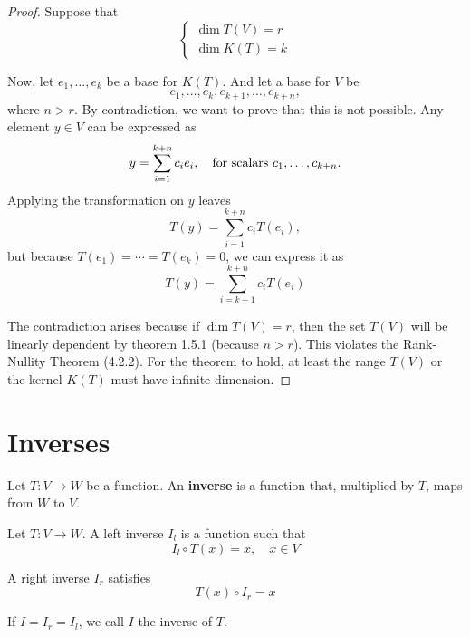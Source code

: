 \documentclass[../linear-spaces.tex]{subfiles}
\begin{document}
\begin{proof}
    Suppose that
    \begin{equation*}
        \begin{cases}
            \dim T(V) = r \\
            \dim K(T) = k
        \end{cases}
    \end{equation*}

    Now, let $e_1,\dots,e_k$ be a base for $K(T)$. And let a base for $V$ be
    \begin{equation*}
        e_1,\dots,e_k,e_{k+1},\dots,e_{k+n},
    \end{equation*}
    where $n > r$. By contradiction, we want to prove that this is not
    possible. Any element $y\in V$ can be expressed as
    \begin{equation*}
        y=\sum_{i=1}^{k+n}{c_i e_i},\quad \textnormal{for scalars } c_1,\dots,c_{k+n}.
    \end{equation*}
    Applying the transformation on $y$ leaves
    \begin{equation*}
        T(y) = \sum_{i=1}^{k+n}{c_i T(e_i)},
    \end{equation*}
    but because $T(e_1) = \cdots = T(e_k) = 0$, we can express it as
    \begin{equation*}
        T(y) = \sum_{i=k+1}^{k+n}{c_i T(e_i)}
    \end{equation*}

    The contradiction arises because if $\dim T(V) = r$, then the set $T(V)$ will
    be linearly dependent by theorem 1.5.1 (because $n>r$). This violates the
    Rank-Nullity Theorem (4.2.2). For the theorem to hold, at least the range
    $T(V)$ or the kernel $K(T)$ must have infinite dimension.
\end{proof}

\section{Inverses}

Let $T: V \to W$ be a function. An \textbf{inverse} is a function that,
multiplied by $T$, maps from $W$ to $V$.

\begin{definition}
    Let $T: V \to W$. A left inverse $I_l$ is a function such that
    \begin{equation}
        I_l \circ T(x) = x,\quad x\in V
    \end{equation}

    A right inverse $I_r$ satisfies
    \begin{equation}
        T(x)\circ I_r = x
    \end{equation}

    If $I = I_r = I_l$, we call $I$ the inverse of $T$.
\end{definition}
\end{document}
